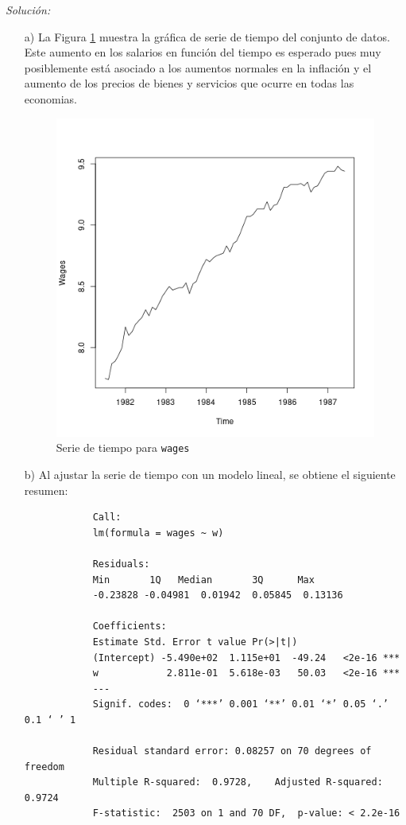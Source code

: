 \documentclass[11pt,letterpaper]{article}
\begin{document}
	\textit{Solución:}
	
	\begin{itemize}
		\item[a)] La Figura \ref{fig:4} muestra la gráfica de serie de tiempo del conjunto de datos. Este aumento en los salarios en función del tiempo es esperado pues muy posiblemente está asociado a los aumentos normales en la inflación y el aumento de los precios de bienes y servicios que ocurre en todas las economias.
		
		\begin{figure}[!h]
			\centering
			\includegraphics[width=0.6\linewidth]{../img/wages_plot.png}
			\caption{Serie de tiempo para \texttt{wages}}
			\label{fig:4}
		\end{figure}
		
		\item[b)] Al ajustar la serie de tiempo con un modelo lineal, se obtiene el siguiente resumen:
		
		\begin{verbatim}
			Call:
			lm(formula = wages ~ w)
			
			Residuals:
			Min       1Q   Median       3Q      Max 
			-0.23828 -0.04981  0.01942  0.05845  0.13136 
			
			Coefficients:
			Estimate Std. Error t value Pr(>|t|)    
			(Intercept) -5.490e+02  1.115e+01  -49.24   <2e-16 ***
			w            2.811e-01  5.618e-03   50.03   <2e-16 ***
			---
			Signif. codes:  0 ‘***’ 0.001 ‘**’ 0.01 ‘*’ 0.05 ‘.’ 0.1 ‘ ’ 1
			
			Residual standard error: 0.08257 on 70 degrees of freedom
			Multiple R-squared:  0.9728,    Adjusted R-squared:  0.9724 
			F-statistic:  2503 on 1 and 70 DF,  p-value: < 2.2e-16
		\end{verbatim}
		

\end{itemize}
\end{document}

